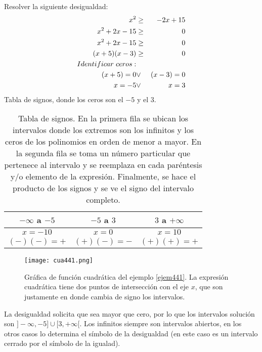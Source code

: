 \begin{myexample}
\label{ejem441}
Resolver la siguiente desigualdad:\\
\begin{eqnarray*}
x^{2}&\geq & -2x+15 \\
x^{2}+2x-15&\geq & 0\\
x^{2}+2x-15&\geq & 0\\
(x+5)(x-3)&\geq & 0\\
Identificar\hspace{3px} ceros: \\
(x+5)=0 &\vee & (x-3)=0\\
x=-5 &\vee & x=3 \\
\end{eqnarray*}
Tabla de signos, donde los ceros son el $-5$ y el $3$.

\begin{center}
	\begin{table}[h!]
	\centering
		\begin{tabular}{|c|c|c|}
\hline
$-\infty$ a $-5$ &$-5$ a $3$ &$3$ a $+\infty$ \\
\hline
$x=-10$ & $x=0$ & $x=10$\\
$(-)(-)=+$ & $(+)(-)=-$ & $(+)(+)=+$ \\
\hline
		\end{tabular}
		\caption[Tabla de signos.]{Tabla de signos. En la primera fila se ubican los intervalos donde los extremos son los infinitos y los ceros de los polinomios en orden de menor a mayor. En la segunda fila se toma un número particular que pertenece al intervalo y se reemplaza en cada paréntesis y/o elemento de la expresión. Finalmente, se hace el producto de los signos y se ve el signo del intervalo completo.}
	\end{table}
\end{center}

\begin{center}
\begin{figure}[h!]
\texttt{[image: cua441.png]}
\caption[Gráfica de función cuadrática del ejemplo \ref{ejem441}.]{Gráfica de función cuadrática del ejemplo \ref{ejem441}. La expresión cuadrática tiene dos puntos de intersección con el eje $x$, que son justamente en donde cambia de signo los intervalos. }
\end{figure}
\end{center}
La desigualdad solicita que sea mayor que cero, por lo que los intervalos solución son $]-\infty,-5]\cup [3,+\infty[$. Los infinitos siempre son intervalos abiertos, en los otros casos lo determina el símbolo de la desigualdad (en este caso es un intervalo cerrado por el símbolo de la igualad).
\end{myexample}

